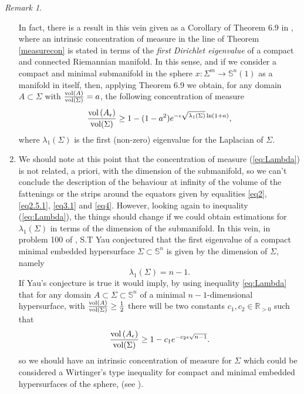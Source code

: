 \documentclass{amsart}
\theoremstyle{definition}
\theoremstyle{remark}
\newtheorem{remark}[theorem]{Remark}
\newcommand{\ese}{\mathbb{S}}
\begin{document}
\begin{remark}
\begin{enumerate}
In fact, there is a result in this vein given as a Corollary of Theorem 6.9 in \cite{MS}, where an intrinsic concentration of measure in the line of Theorem \ref{measurecon} is stated in terms of the {\em first Dirichlet eigenvalue} of a compact and connected Riemannian manifold. In this sense, and if we consider a compact and minimal submanifold in the sphere $x:\Sigma^m \rightarrow \ese^n(1)$ as a manifold in itself, then, applying Theorem 6.9 we obtain, for any domain $A\subset \Sigma$ with $\frac{{\rm vol}(A)}{{\rm vol}( \Sigma)}=a$, the following concentration of measure
\begin{equation}\label{eq:Lambda}
   \frac{{\rm vol}\left(A_\epsilon\right)}{{\rm vol}( \Sigma)}\geq 1-(1-a^2)e^{-\epsilon\sqrt{\lambda_1(\Sigma)}\ln(1+a)}, 
\end{equation}
\noindent where $\lambda_1(\Sigma)$ is the first (non-zero) eigenvalue for the Laplacian of $\Sigma$.  
\medskip

\item We should note at this point that the concentration of measure (\ref{eq:Lambda}) is not related, a priori, with the dimension of the submanifold, so we can't conclude the description of the behaviour at infinity of the volume of the fattenings or the strips around the equators given by equalities \eqref{eq2}, \eqref{eq2.5.1}, \eqref{eq3.1} and \eqref{eq4}. However, looking again to inequality (\ref{eq:Lambda}), the things should change if we could obtain estimations for $\lambda_1(\Sigma)$ in terms of the dimension of the submanifold. In this vein, in problem 100 of \cite{YauMR0645728}, S.T Yau conjectured that the first eigenvalue of a compact minimal embedded hypersurface $\Sigma\subset \mathbb{S}^{n}$ is given by the dimension of $\Sigma$, namely
$$\lambda_1(\Sigma)=n-1.$$
If  Yau's conjecture is true it would  imply, by using inequality \eqref{eq:Lambda} that for any domain $A\subset \Sigma\subset \mathbb{S}^{n}$  of a minimal $n-1$-dimensional hypersurface, with 
 $\frac{{\rm vol}(A)}{{\rm vol}( \Sigma)}\geq \frac{1}{2}$ there will be two constants $c_1,c_2\in \mathbb{R}_{>0}$ such that
 \begin{equation}\label{eq:yau1}
   \frac{{\rm vol}\left(A_\epsilon\right)}{{\rm vol}( \Sigma)}\geq 1-c_1e^{-c_2\epsilon\sqrt{n-1}}. 
\end{equation}
\noindent so we should have an intrinsic concentration of measure for $\Sigma$ which could be considered a Wirtinger's type inequality for compact and minimal embedded hypersurfaces of the sphere, (see \cite{Gromov}).


\end{enumerate}
\end{remark}
\end{document}
